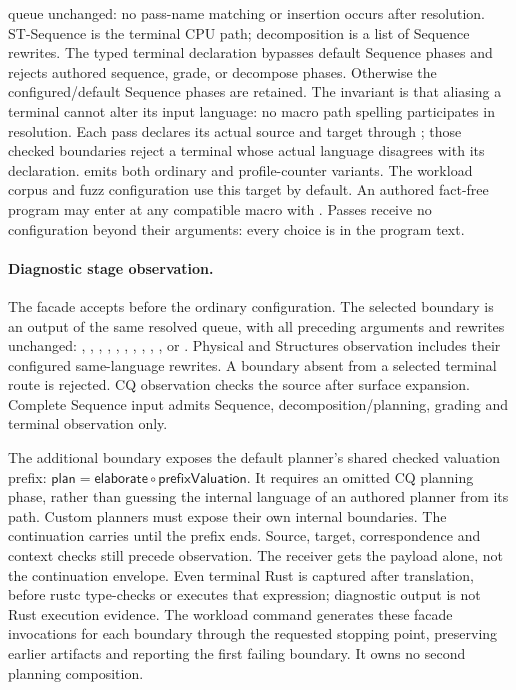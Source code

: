 queue unchanged: no pass-name matching or insertion occurs after resolution.
ST-Sequence is the terminal CPU path; decomposition is a list of Sequence rewrites.
The typed  terminal declaration bypasses
default Sequence phases and rejects authored sequence, grade, or decompose
phases. Otherwise the configured/default Sequence phases are retained.
The invariant is that aliasing a terminal cannot alter its input language:
no macro path spelling participates in resolution. Each pass declares its
actual source and target through ; those checked boundaries
reject a terminal whose actual language disagrees with its declaration.
 emits both ordinary and profile-counter variants.
The workload corpus and fuzz configuration use this target by default.
An authored fact-free program may enter at any compatible macro with
. Passes receive no
configuration beyond their arguments: every choice is in the program text.

\paragraph{Diagnostic stage observation.}
The facade accepts 
before the ordinary  configuration. The selected boundary
is an output of the same resolved queue, with all preceding arguments and
rewrites unchanged: , ,
, , ,
, , , ,
, or . Physical and Structures observation includes
their configured same-language rewrites. A boundary absent from a selected
terminal route is rejected. CQ observation checks the source after surface
expansion. Complete Sequence input admits Sequence, decomposition/planning,
grading and terminal observation only.

The additional  boundary exposes the default planner's shared checked
valuation prefix: $\mathsf{plan}=\mathsf{elaborate}\circ\mathsf{prefixValuation}$.
It requires an omitted CQ planning phase, rather than guessing the internal
language of an authored planner from its path. Custom planners must expose their
own internal boundaries.
The continuation carries  until the
prefix ends. Source, target, correspondence and context checks still precede
observation. The receiver gets the payload alone, not the continuation envelope.
Even terminal Rust is captured after translation, before rustc type-checks or
executes that expression; diagnostic output is not Rust execution evidence.
The workload  command generates these facade invocations for
each boundary through the requested stopping point, preserving earlier artifacts
and reporting the first failing boundary. It owns no second planning composition.


